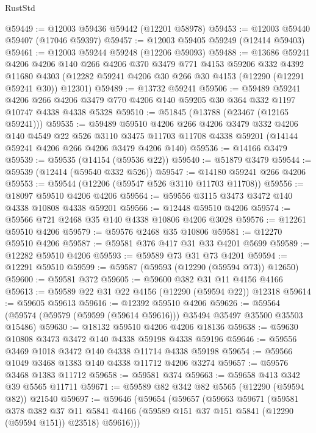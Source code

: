 \begin{lexlean}{RustStd}
\begin{coremodule}
{\begin{coremodule}
{{{{{{{{{{{{{{{{{{{{{{{{{{{{{{{{{{{{{{{{{{{{{{{{{{@59449 := @12003 @59436 @59442 (@12201 @58978)
@59453 := @12003 @59440 @59407 (@17046 @59397)
@59457 := @12003 @59405 @59249 (@12414 @59403)
@59461 := @12003 @59244 @59248 (@12206 @59093)
@59488 := @13686
    @59241
    @4206
    @4206
    @140
    @266
    @4206
    @370
    @3479
    @771
    @4153
    @59206
    @332
    @4392
    @11680
    @4303
    (@12282 @59241 @4206 @30 @266 @30 @4153 (@12290 (@12291 @59241 @30)) @12301)
@59489 := @13732 @59241
@59506 := @59489
    @59241
    @4206
    @266
    @4206
    @3479
    @770
    @4206
    @140
    @59205
    @30
    @364
    @332
    @1197
    @10747
    @4338
    @4338
    @5328
@59510 := @51845 (@13788 (@23467 (@12165 @59241)))
@59535 := @59489
    @59510
    @4206
    @266
    @4206
    @3479
    @332
    @4206
    @140
    @4549
    @22
    @526
    @3110
    @3475
    @11703
    @11708
    @4338
    @59201
    (@14144 @59241 @4206 @266 @4206 @3479 @4206 @140)
@59536 := @14166 @3479
@59539 := @59535 (@14154 (@59536 @22))
@59540 := @51879 @3479
@59544 := @59539 (@12414 (@59540 @332 @526))
@59547 := @14180 @59241 @266 @4206
@59553 := @59544 (@12206 (@59547 @526 @3110 @11703 @11708))
@59556 := @18097 @59510 @4206 @4206
@59564 := @59556 @3115 @3473 @3472 @140 @4338 @10808 @4338 @59201
@59566 := @12448 @59510 @4206
@59574 := @59566 @721 @2468 @35 @140 @4338 @10806 @4206 @3028
@59576 := @12261 @59510 @4206
@59579 := @59576 @2468 @35 @10806
@59581 := @12270 @59510 @4206
@59587 := @59581 @376 @417 @31 @33 @4201 @5699
@59589 := @12282 @59510 @4206
@59593 := @59589 @73 @31 @73 @4201
@59594 := @12291 @59510
@59599 := @59587 (@59593 (@12290 (@59594 @73)) @12650)
@59600 := @59581 @372
@59605 := @59600 @382 @31 @11 @4156 @4166
@59613 := @59589 @22 @31 @22 @4156 (@12290 (@59594 @22)) @12318
@59614 := @59605 @59613
@59616 := @12392 @59510 @4206
@59626 := @59564 (@59574 (@59579 (@59599 (@59614 @59616))) @35494 @35497 @35500 @35503 @15486)
@59630 := @18132 @59510 @4206 @4206 @18136
@59638 := @59630 @10808 @3473 @3472 @140 @4338 @59198 @4338 @59196
@59646 := @59556 @3469 @1018 @3472 @140 @4338 @11714 @4338 @59198
@59654 := @59566 @1049 @3468 @1383 @140 @4338 @11712 @4206 @3274
@59657 := @59576 @3468 @1383 @11712
@59658 := @59581 @374
@59663 := @59658 @413 @342 @39 @5565 @11711
@59671 := @59589 @82 @342 @82 @5565 (@12290 (@59594 @82)) @21540
@59697 := @59646
    (@59654
      (@59657
        (@59663
          @59671
          (@59581
            @378
            @382
            @37
            @11
            @5841
            @4166
            (@59589 @151 @37 @151 @5841 (@12290 (@59594 @151)) @23518)
            @59616)))
}}}}}}}}}}}}}}}}}}}}}}}}}}}}}}}}}}}}}}}}}}}}}}}}}}
\end{coremodule}}
\end{coremodule}
\end{lexlean}

